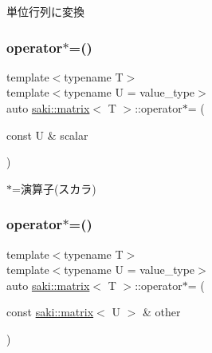 単位行列に変換 

\mbox{\label{classsaki_1_1matrix_ade74f7e19240123da31171ca469246e7}} 
\subsubsection{\texorpdfstring{operator$\ast$=()}{operator*=()}\hspace{0.1cm}{\footnotesize\ttfamily [1/2]}}
{\footnotesize\ttfamily template$<$typename T$>$ \\
template$<$typename U  = value\+\_\+type$>$ \\
auto \mbox{\hyperlink{classsaki_1_1matrix}{saki\+::matrix}}$<$ T $>$\+::operator$\ast$= (\begin{DoxyParamCaption}\item[{const U \&}]{scalar }\end{DoxyParamCaption})\hspace{0.3cm}{\ttfamily [inline]}}



$\ast$=演算子(スカラ) 

\mbox{\label{classsaki_1_1matrix_acb32e13e61d31a15341fbf2996f6428b}} 
\subsubsection{\texorpdfstring{operator$\ast$=()}{operator*=()}\hspace{0.1cm}{\footnotesize\ttfamily [2/2]}}
{\footnotesize\ttfamily template$<$typename T$>$ \\
template$<$typename U  = value\+\_\+type$>$ \\
auto \mbox{\hyperlink{classsaki_1_1matrix}{saki\+::matrix}}$<$ T $>$\+::operator$\ast$= (\begin{DoxyParamCaption}\item[{const \mbox{\hyperlink{classsaki_1_1matrix}{saki\+::matrix}}$<$ U $>$ \&}]{other }\end{DoxyParamCaption})\hspace{0.3cm}{\ttfamily [inline]}}




